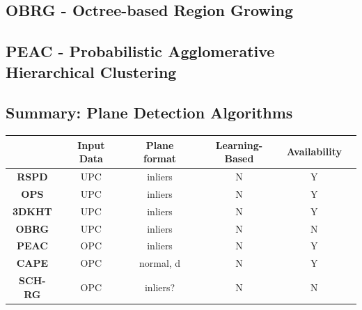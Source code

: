 \documentclass[main.tex]{subfiles}
\begin{document}
\subsection*{OBRG - Octree-based Region Growing}
\subsection*{PEAC - Probabilistic Agglomerative Hierarchical Clustering}

\subsection{Summary: Plane Detection Algorithms}

\begin{table}[!ht]
    \centering
    \begin{tabular}{|c|c|c|c|c|c}
        \hline
                                                                         & \textbf{Input Data} & \textbf{Plane format}                 & \textbf{Learning-Based} & \textbf{Availability} \\ \hline
        \textbf{RSPD} \cite{Araújo_Oliveira_2020}                        & UPC                 & inliers                               & N                       & Y                     \\ \hline
        \textbf{OPS} \cite{Sun_Mordohai_2019}                            & UPC                 & inliers                               & N                       & Y                     \\ \hline
        \textbf{3DKHT} \cite{Limberger_Oliveira_2015}                    & UPC                 & inliers                               & N                       & Y                     \\ \hline
        \textbf{OBRG} \cite{Vo_Truong-Hong_Laefer_Bertolotto_2015}       & UPC                 & inliers                        & N                       & N                     \\ \hline
        \textbf{PEAC} \cite{Feng_Taguchi_Kamat_2014}                     & OPC                 & inliers                               & N                       & Y                     \\ \hline
        \textbf{CAPE} \cite{Proença_Gao_2018}                            & OPC                 & normal, d                             & N                       & Y                     \\ \hline
        \textbf{SCH-RG} \cite{Mols_Li_Hanebeck_2020}                     & OPC                 & inliers?                              & N                       & N                     \\ \hline

\end{tabular}
\end{table}
\end{document}
